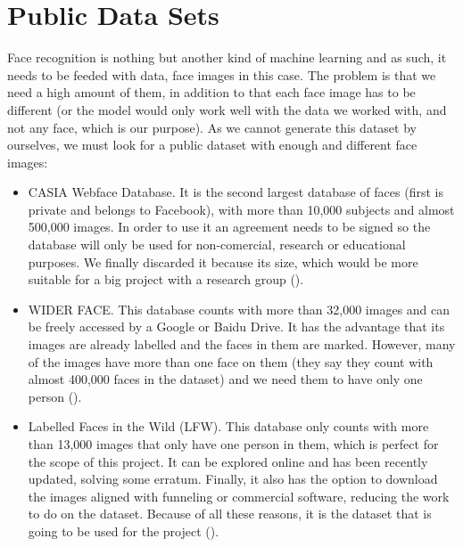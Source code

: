 

\section{Public Data Sets} 
Face recognition is nothing but another kind of machine learning and as such, it needs to be feeded with data, face images in this case. The problem is that we need a high amount of them, in addition to that each face image has to be different (or the model would only work well with the data we worked with, and not any face, which is our purpose). As we cannot generate this dataset by ourselves, we must look for a public dataset with enough and different face images:

\begin{itemize}
	\item CASIA Webface Database. It is the second largest database of faces (first is private and belongs to Facebook), with more than 10,000 subjects and almost 500,000 images. In order to use it an agreement needs to be signed so the database will only be used for non-comercial, research or educational purposes. We finally discarded it because its size, which would be more suitable for a big project with a research group (\cite{casia_db}). 
	\item WIDER FACE. This database counts with more than 32,000 images and can be freely accessed by a Google or Baidu Drive. It has the advantage that its images are already labelled and the faces in them are marked. However, many of the images have more than one face on them (they say they count with almost 400,000 faces in the dataset) and we need them to have only one person (\cite{widerf_db}).
	\item Labelled Faces in the Wild (LFW). This database only counts with more than 13,000 images that only have one person in them, which is perfect for the scope of this project. It can be explored online and has been recently updated, solving some erratum. Finally, it also has the option to download the images aligned with funneling or commercial software, reducing the work to do on the dataset. Because of all these reasons, it is the dataset that is going to be used for the project (\cite{lfw_db}).
\end{itemize}

